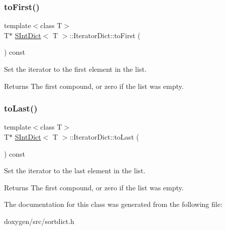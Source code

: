 \subsubsection{\texorpdfstring{toFirst()}{toFirst()}}
{\footnotesize\ttfamily template$<$class T$>$ \\
T$\ast$ \mbox{\hyperlink{class_s_int_dict}{S\+Int\+Dict}}$<$ T $>$\+::Iterator\+Dict\+::to\+First (\begin{DoxyParamCaption}{ }\end{DoxyParamCaption}) const\hspace{0.3cm}{\ttfamily [inline]}}

Set the iterator to the first element in the list. \begin{DoxyReturn}{Returns}
The first compound, or zero if the list was empty. 
\end{DoxyReturn}
\mbox{\label{class_s_int_dict_1_1_iterator_dict_a767f9665e1ede5ff95c5890c499620bc}} 
\subsubsection{\texorpdfstring{toLast()}{toLast()}}
{\footnotesize\ttfamily template$<$class T$>$ \\
T$\ast$ \mbox{\hyperlink{class_s_int_dict}{S\+Int\+Dict}}$<$ T $>$\+::Iterator\+Dict\+::to\+Last (\begin{DoxyParamCaption}{ }\end{DoxyParamCaption}) const\hspace{0.3cm}{\ttfamily [inline]}}

Set the iterator to the last element in the list. \begin{DoxyReturn}{Returns}
The first compound, or zero if the list was empty. 
\end{DoxyReturn}


The documentation for this class was generated from the following file\+:\begin{DoxyCompactItemize}
\item 
doxygen/src/sortdict.\+h\end{DoxyCompactItemize}
